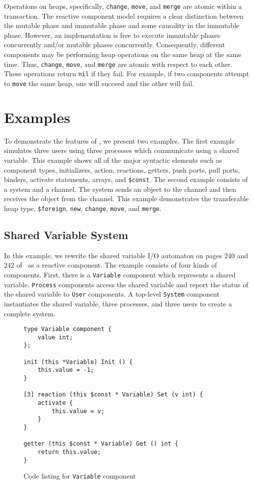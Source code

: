 Operations on heaps, specifically, \verb+change+, \verb+move+, and \verb+merge+ are atomic within a transaction.
The reactive component model requires a clear distinction between the mutable phase and immutable phase and some causality in the immutable phase.
However, an implementation is free to execute immutable phases concurrently and/or mutable phases concurrently.
Consequently, different components may be performing heap operations on the same heap at the same time.
Thus, \verb+change+, \verb+move+, and \verb+merge+ are atomic with respect to each other.
These operations return \verb+nil+ if they fail.
For example, if two components attempt to \verb+move+ the same heap, one will succeed and the other will fail.

\section{Examples}

To demonstrate the features of \rcgo{}, we present two examples.
The first example simulates three users using three processes which communicate using a shared variable.
This example shows all of the major syntactic elements such as component types, initializers, action, reactions, getters, push ports, pull ports, binders, activate statements, arrays, and \verb+$const+.
The second example consists of a system and a channel.
The system sends an object to the channel and then receives the object from the channel.
This example demonstrates the transferable heap type, \verb+$foreign+, \verb+new+, \verb+change+, \verb+move+, and \verb+merge+.

\subsection{Shared Variable System}

In this example, we rewrite the shared variable I/O automaton on pages 240 and 242 of~\cite{nancy1996distributed} as a reactive component.
The example consists of four kinds of components.
First, there is a \verb+Variable+ component which represents a shared variable.
\verb+Process+ components access the shared variable and report the status of the shared variable to \verb+User+ components.
A top-level \verb+System+ component instantiates the shared variable, three processes, and three users to create a complete system.

\begin{figure}
\begin{verbatim}
type Variable component {
    value int;
};

init (this *Variable) Init () {
    this.value = -1;
}

[3] reaction (this $const * Variable) Set (v int) {
    activate {
        this.value = v;
    }
}

getter (this $const * Variable) Get () int {
    return this.value;
}
\end{verbatim}
\cprotect\caption{Code listing for \verb+Variable+ component}
\label{variable}
\end{figure}

